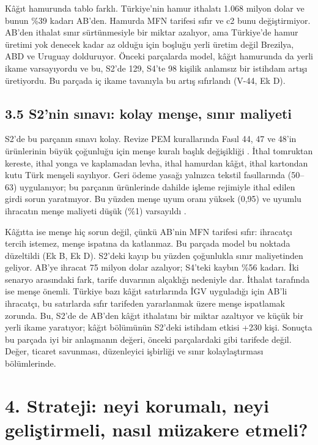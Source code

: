 Kâğıt hamurunda tablo farklı. Türkiye'nin hamur ithalatı 1.068 milyon dolar ve bunun \%39 kadarı AB'den. Hamurda MFN tarifesi sıfır ve c2 bunu değiştirmiyor. AB'den ithalat sınır sürtünmesiyle bir miktar azalıyor, ama Türkiye'de hamur üretimi yok denecek kadar az olduğu için boşluğu yerli üretim değil Brezilya, ABD ve Uruguay dolduruyor. Önceki parçalarda model, kâğıt hamurunda da yerli ikame varsayıyordu ve bu, S2'de 129, S4'te 98 kişilik anlamsız bir istihdam artışı üretiyordu. Bu parçada iç ikame tavanıyla bu artış sıfırlandı (V-44, Ek D).

\hypertarget{nace_kartlar_16-18-35-s2nin-sux131navux131-kolay-menux15fe-sux131nux131r-maliyeti}{%
\subsection{3.5 S2'nin sınavı: kolay menşe, sınır maliyeti}\label{nace_kartlar_16-18-35-s2nin-sux131navux131-kolay-menux15fe-sux131nux131r-maliyeti}}

S2'de bu parçanın sınavı kolay. Revize PEM kurallarında Fasıl 44, 47 ve 48'in ürünlerinin büyük çoğunluğu için menşe kuralı başlık değişikliği \etiketV{}. İthal tomruktan kereste, ithal yonga ve kaplamadan levha, ithal hamurdan kâğıt, ithal kartondan kutu Türk menşeli sayılıyor. Geri ödeme yasağı yalnızca tekstil fasıllarında (50--63) uygulanıyor; bu parçanın ürünlerinde dahilde işleme rejimiyle ithal edilen girdi sorun yaratmıyor. Bu yüzden menşe uyum oranı yüksek (0,95) ve uyumlu ihracatın menşe maliyeti düşük (\%1) varsayıldı \etiketH{}.

Kâğıtta ise menşe hiç sorun değil, çünkü AB'nin MFN tarifesi sıfır: ihracatçı tercih istemez, menşe ispatına da katlanmaz. Bu parçada model bu noktada düzeltildi (Ek B, Ek D). S2'deki kayıp bu yüzden çoğunlukla sınır maliyetinden geliyor. AB'ye ihracat 75 milyon dolar azalıyor; S4'teki kaybın \%56 kadarı. İki senaryo arasındaki fark, tarife duvarının alçaklığı nedeniyle dar. İthalat tarafında ise menşe önemli. Türkiye bazı kâğıt satırlarında İGV uyguladığı için AB'li ihracatçı, bu satırlarda sıfır tarifeden yararlanmak üzere menşe ispatlamak zorunda. Bu, S2'de de AB'den kâğıt ithalatını bir miktar azaltıyor ve küçük bir yerli ikame yaratıyor; kâğıt bölümünün S2'deki istihdam etkisi +230 kişi. Sonuçta bu parçada iyi bir anlaşmanın değeri, önceki parçalardaki gibi tarifede değil. Değer, ticaret savunması, düzenleyici işbirliği ve sınır kolaylaştırması bölümlerinde.

\hypertarget{nace_kartlar_16-18-4-strateji-neyi-korumalux131-neyi-geliux15ftirmeli-nasux131l-muxfczakere-etmeli}{%
\section{4. Strateji: neyi korumalı, neyi geliştirmeli, nasıl müzakere etmeli?}\label{nace_kartlar_16-18-4-strateji-neyi-korumalux131-neyi-geliux15ftirmeli-nasux131l-muxfczakere-etmeli}}

